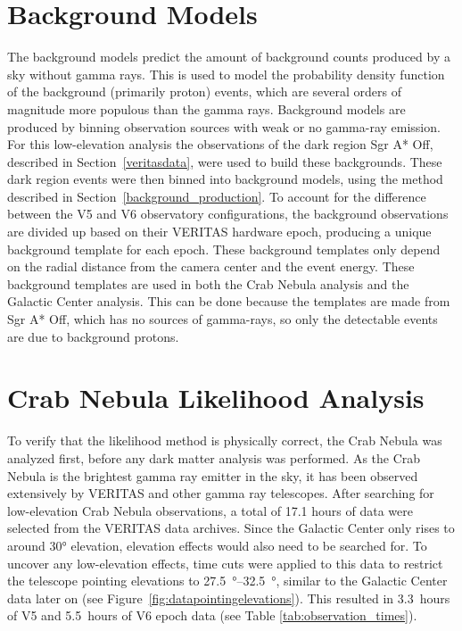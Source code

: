 \section{Background Models}\label{sec:bkgmodels}
  The background models predict the amount of background counts produced by a sky without gamma rays.
  This is used to model the probability density function of the background (primarily proton) events, which are several orders of magnitude more populous than the gamma rays.
  Background models are produced by binning observation sources with weak or no gamma-ray emission.
  For this low-elevation analysis the observations of the dark region Sgr A* Off, described in Section~\ref{veritasdata}, were used to build these backgrounds.
  These dark region events were then binned into background models, using the method described in Section~\ref{background_production}.
  To account for the difference between the V5 and V6 observatory configurations, the background observations are divided up based on their VERITAS hardware epoch, producing a unique background template for each epoch.
  These background templates only depend on the radial distance from the camera center and the event energy.
  These background templates are used in both the Crab Nebula analysis and the Galactic Center analysis.
  This can be done because the templates are made from Sgr A* Off, which has no sources of gamma-rays, so only the detectable events are due to background protons.

\section{Crab Nebula Likelihood Analysis}\label{sec:crab_analysis}
  To verify that the likelihood method is physically correct, the Crab Nebula was analyzed first, before any dark matter analysis was performed.
  As the Crab Nebula is the brightest gamma ray emitter in the sky, it has been observed extensively by VERITAS and other gamma ray telescopes.
  After searching for low-elevation Crab Nebula observations, a total of 17.1 hours of data were selected from the VERITAS data archives.
  Since the Galactic Center only rises to around \ang{30} elevation, elevation effects would also need to be searched for.
  To uncover any low-elevation effects, time cuts were applied to this data to restrict the telescope pointing elevations to \SIrange{27.5}{32.5}{\degree}, similar to the Galactic Center data later on (see Figure~\ref{fig:datapointingelevations}).
  This resulted in \SI{3.3}{hours} of V5 and \SI{5.5}{hours} of V6 epoch data (see Table \ref{tab:observation_times}).
    
